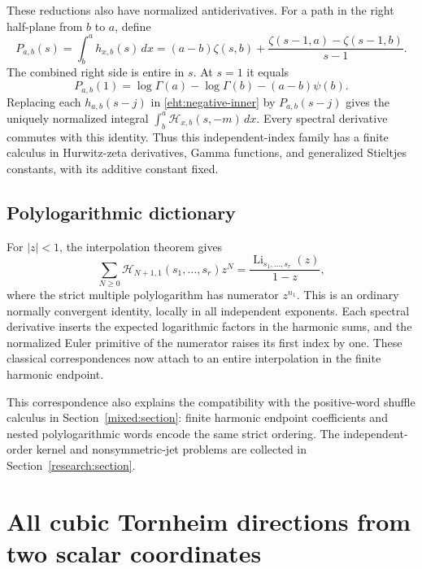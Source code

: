 \documentclass[11pt]{article}
\numberwithin{equation}{section}
\theoremstyle{plain}
\theoremstyle{definition}
\theoremstyle{remark}
\begin{document}
These reductions also have normalized antiderivatives.  For a path in
the right half-plane from $b$ to $a$, define
\begin{equation}\label{eht:primitive}
 P_{a,b}(s)=\int_b^a h_{x,b}(s)\,dx
    =(a-b)\zeta(s,b)
     +\frac{\zeta(s-1,a)-\zeta(s-1,b)}{s-1}.
\end{equation}
The combined right side is entire in $s$.  At $s=1$ it equals
\[
 P_{a,b}(1)=\log\Gamma(a)-\log\Gamma(b)-(a-b)\psi(b).
\]
Replacing each $h_{a,b}(s-j)$ in \eqref{eht:negative-inner} by
$P_{a,b}(s-j)$ gives the uniquely normalized integral
$\int_b^a\mathcal H_{x,b}(s,-m)\,dx$.  Every spectral derivative
commutes with this identity.  Thus this independent-index family has a
finite calculus in Hurwitz-zeta derivatives, Gamma functions, and
generalized Stieltjes constants, with its additive constant fixed.

\subsection{Polylogarithmic dictionary}

For $|z|<1$, the interpolation theorem gives
\begin{equation}\label{eht:polylog}
 \sum_{N\ge0}\mathcal H_{N+1,1}(s_1,\ldots,s_r)z^N
  =\frac{\operatorname{Li}_{s_1,\ldots,s_r}(z)}{1-z},
\end{equation}
where the strict multiple polylogarithm has numerator $z^{n_1}$.
This is an ordinary normally convergent identity, locally in all
independent exponents.  Each spectral derivative inserts the expected
logarithmic factors in the harmonic sums, and the normalized Euler
primitive of the numerator raises its first index by one.  These
classical correspondences now attach to an entire interpolation in the
finite harmonic endpoint.

This correspondence also explains the compatibility with the positive-word
shuffle calculus in Section~\ref{mixed:section}: finite harmonic endpoint
coefficients and nested polylogarithmic words encode the same strict
ordering. The independent-order kernel and nonsymmetric-jet problems
are collected in Section~\ref{research:section}.



\section{All cubic Tornheim directions from two scalar coordinates}
\label{tr3:section}
\end{document}
